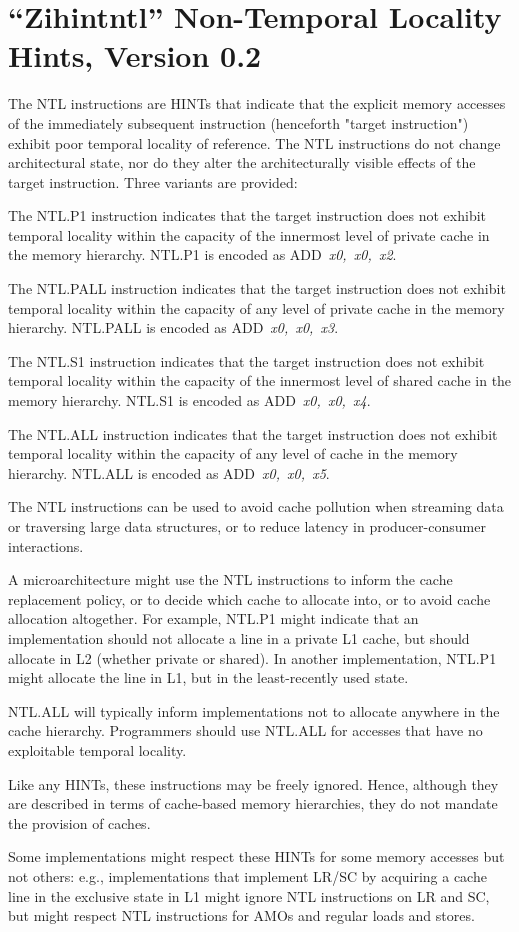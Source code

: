 \chapter{``Zihintntl'' Non-Temporal Locality Hints, Version 0.2}
\label{chap:zihintpause}

The NTL instructions are HINTs that indicate that the explicit memory accesses of the immediately subsequent
instruction (henceforth "target instruction") exhibit poor temporal locality of reference.
The NTL instructions do not change architectural state, nor do they alter the
architecturally visible effects of the target instruction.
Three variants are provided:

The NTL.P1 instruction indicates that the target instruction
does not exhibit temporal locality within the capacity of the innermost level
of private cache in the memory hierarchy.
NTL.P1 is encoded as \mbox{ADD {\em x0, x0, x2}}.

The NTL.PALL instruction indicates that the target instruction
does not exhibit temporal locality within the capacity of any
level of private cache in the memory hierarchy.
NTL.PALL is encoded as \mbox{ADD {\em x0, x0, x3}}.

The NTL.S1 instruction indicates that the target instruction
does not exhibit temporal locality within the capacity of the innermost level
of shared cache in the memory hierarchy.
NTL.S1 is encoded as \mbox{ADD {\em x0, x0, x4}}.

The NTL.ALL instruction indicates that the target
instruction does not exhibit temporal locality within the capacity of any
level of cache in the memory hierarchy.
NTL.ALL is encoded as \mbox{ADD {\em x0, x0, x5}}.

\begin{commentary}
The NTL instructions can be used to avoid cache pollution when streaming data
or traversing large data structures, or to reduce latency in producer-consumer
interactions.

A microarchitecture might use the NTL instructions to inform the cache
replacement policy, or to decide which cache to allocate into, or to avoid
cache allocation altogether.
For example, NTL.P1 might indicate that an implementation should not allocate
a line in a private L1 cache, but should allocate in L2 (whether private or
shared).
In another implementation, NTL.P1 might allocate the line in L1, but in
the least-recently used state.

NTL.ALL will typically inform implementations not to allocate anywhere in the
cache hierarchy.
Programmers should use NTL.ALL for accesses that have no exploitable temporal
locality.

Like any HINTs, these instructions may be freely ignored.
Hence, although they are described in terms of cache-based memory hierarchies,
they do not mandate the provision of caches.

Some implementations might respect these HINTs for some memory accesses but
not others: e.g., implementations that implement LR/SC by acquiring a
cache line in the exclusive state in L1 might ignore NTL instructions
on LR and SC, but might respect NTL instructions for
AMOs and regular loads and stores.
\end{commentary}

